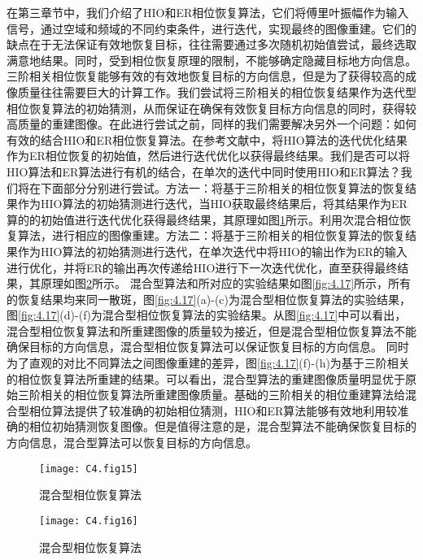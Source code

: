 在第三章节中，我们介绍了HIO和ER相位恢复算法，它们将傅里叶振幅作为输入信号，通过空域和频域的不同约束条件，进行迭代，实现最终的图像重建。它们的缺点在于无法保证有效地恢复目标，往往需要通过多次随机初始值尝试，最终选取满意地结果。同时，受到相位恢复原理的限制，不能够确定隐藏目标地方向信息。三阶相关相位恢复能够有效的有效地恢复目标的方向信息，但是为了获得较高的成像质量往往需要巨大的计算工作。我们尝试将三阶相关的相位恢复结果作为迭代型相位恢复算法的初始猜测，从而保证在确保有效恢复目标方向信息的同时，获得较高质量的重建图像。在此进行尝试之前，同样的我们需要解决另外一个问题：如何有效的结合HIO和ER相位恢复算法。在参考文献\cite*{bertolotti_non-invasive_2012,katz_non-invasive_2014}中，将HIO算法的迭代优化结果作为ER相位恢复的初始值，然后进行迭代优化以获得最终结果。我们是否可以将HIO算法和ER算法进行有机的结合，在单次的迭代中同时使用HIO和ER算法？我们将在下面部分分别进行尝试。方法一：将基于三阶相关的相位恢复算法的恢复结果作为HIO算法的初始猜测进行迭代，当HIO获取最终结果后，将其结果作为ER算的的初始值进行迭代优化获得最终结果，其原理如图\ref{fig:4.15}所示。利用次混合相位恢复算法，进行相应的图像重建。方法二：将基于三阶相关的相位恢复算法的恢复结果作为HIO算法的初始猜测进行迭代，在单次迭代中将HIO的输出作为ER的输入进行优化，并将ER的输出再次传递给HIO进行下一次迭代优化，直至获得最终结果，其原理如图\ref{fig:4.16}所示。
混合型算法和所对应的实验结果如图\ref{fig:4.17}所示，所有的恢复结果均来同一散斑，图\ref{fig:4.17}(a)-(c)为混合型相位恢复算法的实验结果，图\ref{fig:4.17}(d)-(f)为混合型相位恢复算法的实验结果。从图\ref{fig:4.17}中可以看出，混合型相位恢复算法和所重建图像的质量较为接近，但是混合型相位恢复算法不能确保目标的方向信息，混合型相位恢复算法可以保证恢复目标的方向信息。
同时为了直观的对比不同算法之间图像重建的差异，图\ref{fig:4.17}(f)-(h)为基于三阶相关的相位恢复算法所重建的结果。可以看出，混合型算法的重建图像质量明显优于原始三阶相关的相位恢复算法所重建图像质量。基础的三阶相关的相位重建算法给混合型相位算法提供了较准确的初始相位猜测，HIO和ER算法能够有效地利用较准确的相位初始猜测恢复图像。但是值得注意的是，混合型算法不能确保恢复目标的方向信息，混合型算法可以恢复目标的方向信息。
\begin{figure}[htp]
	\centering
	\texttt{[image: C4.fig15]}
	\caption{混合型相位恢复算法}
	\label{fig:4.15}
\end{figure}

\begin{figure}[htp]
	\centering
	\texttt{[image: C4.fig16]}
	\caption{混合型相位恢复算法}
	\label{fig:4.16}
\end{figure}


